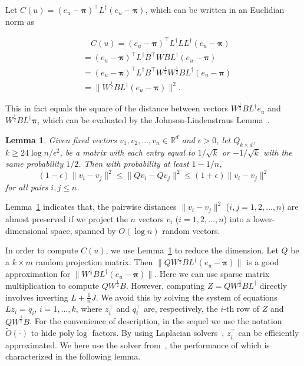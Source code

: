 \documentclass[sigconf]{acmart}
\newtheorem{lemma}[theorem]{Lemma}
\newcommand\ppi{\boldsymbol{\pi}}
\newcommand\ee{\boldsymbol{\mathit{e}}}
\newcommand\qq{\boldsymbol{\mathit{q}}}
\renewcommand\vv{\boldsymbol{\mathit{v}}}
\newcommand\zz{\boldsymbol{\mathit{z}}}
\newcommand\BB{\boldsymbol{\mathit{B}}}
\newcommand\JJ{\boldsymbol{\mathit{J}}}
\newcommand\LL{\boldsymbol{\mathit{L}}}
\newcommand\QQ{\boldsymbol{\mathit{Q}}}
\newcommand\WW{\boldsymbol{\mathit{W}}}
\newcommand\ZZ{\boldsymbol{\mathit{Z}}}
\newcommand\Otil{\widetilde{O}}
\begin{document}

Let $C(u)=(\ee_u - \ppi)^{\top} \LL^{\dagger} (\ee_u- \ppi)$, which can be written in an Euclidian norm as
\begin{small}
	\begin{equation}\label{EE12}
		\begin{split}
			&\quad C(u)=(\ee_u - \ppi)^{\top} \LL^{\dagger} \LL \LL^{\dagger} (\ee_u - \ppi) \\
			&=(\ee_u - \ppi)^{\top} \LL^{\dagger} \BB^{\top} \WW \BB \LL^{\dagger} (\ee_u - \ppi) \\
			&=(\ee_u - \ppi)^{\top} \LL^{\dagger} \BB^{\top} \WW^{\frac{1}{2}} \WW^{\frac{1}{2}} \BB \LL^{\dagger} (\ee_u - \ppi) \\
			&=\|\WW^{\frac{1}{2}} \BB \LL^{\dagger} (\ee_u - \ppi)\|^2.
		\end{split}
	\end{equation}
\end{small}
This  in fact  equals the square of the distance between  vectors  $\WW^{\frac{1}{2}} \BB \LL^{\dagger} \ee_u$ and $\WW^{\frac{1}{2}} \BB \LL^{\dagger} \ppi$, which can be evaluated by the Johnson-Lindenstraus
Lemma~\cite{Ac01}.
\begin{lemma}%
	\label{lemma:JL}
	Given fixed vectors $\vv_1,\vv_2,\ldots,\vv_n\in \mathbb{R}^d$ and
	$\epsilon>0$, let
	$\QQ_{k\times d}$,  $k\ge 24\log n/\epsilon^2$, be a matrix with each  entry equal  to $1/\sqrt{k}$ or $- 1/\sqrt{k}$  with the same probability $1/2$. Then with probability at least $1-1/n$,
	\[(1-\epsilon)\|\vv_i-\vv_j\|^2\le \|\QQ \vv_i-\QQ \vv_j\|^2\le
		(1+\epsilon)\|\vv_i-\vv_j\|^2\] for all pairs $i,j\le n$.
\end{lemma}
Lemma~\ref{lemma:JL} indicates that,  the pairwise distances $\|\vv_i-\vv_j\|^2$ ($i,j=1,2,\ldots, n$) are almost preserved if we
project the $n$ vectors $\vv_i$ ($i=1,2,\ldots, n$)  into a lower-dimensional space, spanned
by $O(\log n)$ random vectors.

In order to compute  $C(u)$, we use Lemma~\ref{lemma:JL} to reduce the dimension. Let $\QQ$ be a $k\times m$ random projection matrix. Then  $\|\QQ \WW^{\frac{1}{2}} \BB \LL^{\dagger}(\ee_u-\ppi)\|$ is a good approximation for $\|\WW^{\frac{1}{2}} \BB \LL^{\dagger} (\ee_u - \ppi)\|$. Here we can use sparse matrix multiplication to compute $\QQ \WW^{\frac{1}{2}} \BB$. However, computing $\ZZ=\QQ \WW^{\frac{1}{2}} \BB \LL^{\dagger}$ directly involves inverting $\LL+\frac{1}{n}\JJ$. We avoid this by solving the system of equations $\LL \zz_i=\qq_i$, $i=1,\ldots,k$, where  $\zz^\top_i$ and $\qq^\top_i$ are, respectively, the $i$-th row of $\ZZ$ and $\QQ \WW^{\frac{1}{2}} \BB$. For the convenience  of description, in the sequel we use the notation $\Otil(\cdot)$ to hide $\mathrm{poly} \log $ factors. By using Laplacian solvers~\cite{SpTe04,Sp10,KoMiPe11,LiBr12,CoKyMiPaPeRaSu14,KySa16}, $\zz^\top _i$ can be efficiently approximated.  We here use the  solver from~\cite{CoKyMiPaPeRaSu14}, the performance of which is characterized in the following lemma.
\end{document}
